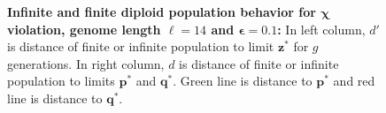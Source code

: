 \begin{figure}[h]
\begin{center}
\hspace{-3em}%
\vspace{-0.5em}  \hspace{-3em}%


\caption[\textbf{Infinite and finite diploid population behavior for $\bm{\chi}$ violation, genome length $\ell = 14$ and $\bm{\epsilon} = 0.1$}]{\textbf{Infinite and finite diploid population behavior for $\bm{\chi}$ violation, genome length $\ell = 14$ and $\bm{\epsilon} = 0.1$:} 
  In left column, $d'$ is distance of finite or infinite population to limit $\bm{z}^\ast$ for $g$ generations. In right column, $d$ is distance of finite or infinite population to limits $\bm{p}^\ast$ and $\bm{q}^\ast$. Green line is distance to $\bm{p}^\ast$ and red line is distance to $\bm{q}^\ast$.}
\label{oscillation_14d_vio_chi_0.1}
\end{center}
\end{figure}

